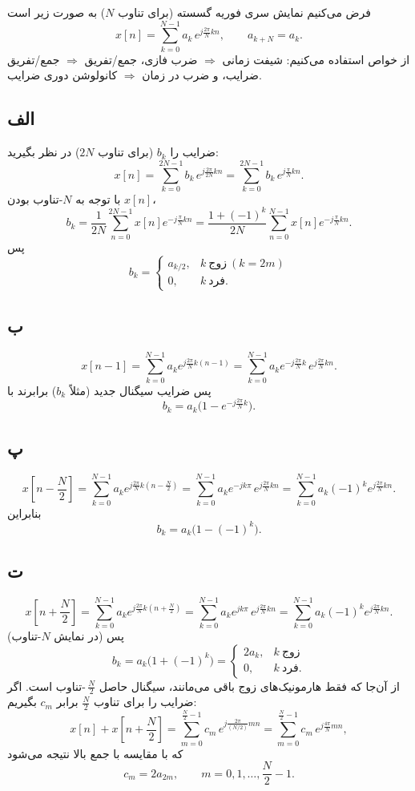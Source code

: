 فرض می‌کنیم نمایش سری فوریه گسسته (برای تناوب $N$) به صورت زیر است
\[
x[n]=\sum_{k=0}^{N-1} a_k\, e^{j\frac{2\pi}{N}kn},
\qquad a_{k+N}=a_k .
\]
از خواص  استفاده می‌کنیم: شیفت زمانی $\Rightarrow$ ضرب فازی، جمع/تفریق $\Rightarrow$ جمع/تفریق ضرایب، و ضرب در زمان $\Rightarrow$ کانولوشن دوری ضرایب.

\subsection*{الف}
ضرایب را $b_k$ (برای تناوب $2N$) در نظر بگیرید:
\[
x[n]=\sum_{k=0}^{2N-1} b_k\, e^{j\frac{2\pi}{2N}kn}
=\sum_{k=0}^{2N-1} b_k\, e^{j\frac{\pi}{N}kn}.
\]
با توجه به $N$-تناوب بودن $x[n]$،
\[
b_k=\frac{1}{2N}\sum_{n=0}^{2N-1}x[n]e^{-j\frac{\pi}{N}kn}
=\frac{1+(-1)^k}{2N}\sum_{n=0}^{N-1}x[n]e^{-j\frac{\pi}{N}kn}.
\]
پس
\[
b_k=
\begin{cases}
a_{k/2}, & k \ \text{زوج} \ (k=2m)\\
0, & k \ \text{فرد}.
\end{cases}
\]

\subsection*{ب}
\[
x[n-1]=\sum_{k=0}^{N-1} a_k e^{j\frac{2\pi}{N}k(n-1)}
=\sum_{k=0}^{N-1} a_k e^{-j\frac{2\pi}{N}k}\, e^{j\frac{2\pi}{N}kn}.
\]
پس ضرایب سیگنال جدید (مثلاً $b_k$) برابرند با
\[
b_k=a_k\Big(1-e^{-j\frac{2\pi}{N}k}\Big).
\]

\subsection*{پ}
\[
x\!\left[n-\frac{N}{2}\right]
=\sum_{k=0}^{N-1} a_k e^{j\frac{2\pi}{N}k(n-\frac{N}{2})}
=\sum_{k=0}^{N-1} a_k e^{-jk\pi}\, e^{j\frac{2\pi}{N}kn}
=\sum_{k=0}^{N-1} a_k (-1)^k e^{j\frac{2\pi}{N}kn}.
\]
بنابراین
\[
b_k=a_k\big(1-(-1)^k\big).
\]

\subsection*{ت}
\[
x\!\left[n+\frac{N}{2}\right]
=\sum_{k=0}^{N-1} a_k e^{j\frac{2\pi}{N}k(n+\frac{N}{2})}
=\sum_{k=0}^{N-1} a_k e^{jk\pi}\, e^{j\frac{2\pi}{N}kn}
=\sum_{k=0}^{N-1} a_k (-1)^k e^{j\frac{2\pi}{N}kn}.
\]
پس (در نمایش $N$-تناوب)
\[
b_k=a_k\big(1+(-1)^k\big)
=
\begin{cases}
2a_k, & k \ \text{زوج}\\
0, & k \ \text{فرد}.
\end{cases}
\]
از آن‌جا که فقط هارمونیک‌های زوج باقی می‌مانند، سیگنال حاصل $\,\frac{N}{2}$-تناوب است. اگر ضرایب را برای تناوب $\frac{N}{2}$ برابر $c_m$ بگیریم:
\[
x[n]+x\!\left[n+\frac{N}{2}\right]
=\sum_{m=0}^{\frac{N}{2}-1} c_m\, e^{j\frac{2\pi}{(N/2)}mn}
=\sum_{m=0}^{\frac{N}{2}-1} c_m\, e^{j\frac{4\pi}{N}mn},
\]
که با مقایسه با جمع بالا نتیجه می‌شود
\[
c_m = 2a_{2m}, \qquad m=0,1,\dots,\frac{N}{2}-1.
\]

